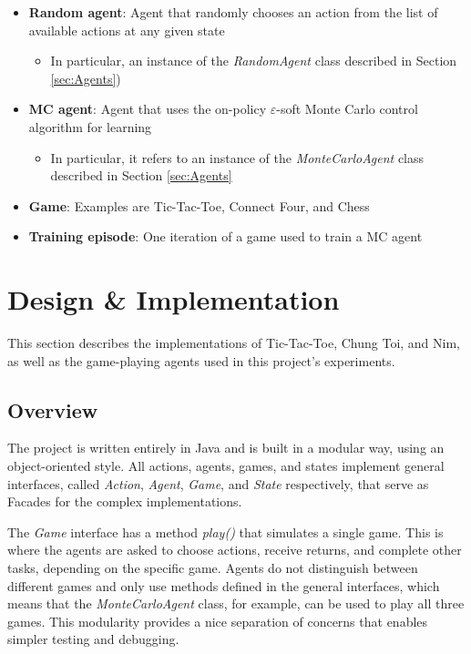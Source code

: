 \documentclass[11pt,a4paper]{report}
\begin{document}
\begin{itemize}

	\item \textbf{Random agent}: Agent that randomly chooses an action from the list of available actions at any given state
		\begin{itemize}
			\item In particular, an instance of the \emph{RandomAgent} class described in Section \ref{sec:Agents})
		\end{itemize}

	\item \textbf{MC agent}: Agent that uses the on-policy $\varepsilon$-soft Monte Carlo control algorithm for learning
		\begin{itemize}
			\item In particular, it refers to an instance of the \emph{MonteCarloAgent} class described in Section \ref{sec:Agents}
		\end{itemize}

	\item \textbf{Game}: Examples are Tic-Tac-Toe, Connect Four, and Chess

	\item \textbf{Training episode}: One iteration of a game used to train a MC agent

\end{itemize}


\chapter{Design \& Implementation}

This section describes the implementations of Tic-Tac-Toe, Chung Toi, and Nim, as well as the game-playing agents used in this project's experiments.


\section{Overview}

The project is written entirely in Java and is built in a modular way, using an object-oriented style. All actions, agents, games, and states implement general interfaces, called \emph{Action}, \emph{Agent}, \emph{Game}, and \emph{State} respectively, that serve as Facades for the complex implementations.

The \emph{Game} interface has a method \emph{play()} that simulates a single game. This is where the agents are asked to choose actions, receive returns, and complete other tasks, depending on the specific game. Agents do not distinguish between different games and only use methods defined in the general interfaces, which means that the \emph{MonteCarloAgent} class, for example, can be used to play all three games. This modularity provides a nice separation of concerns that enables simpler testing and debugging.
\end{document}
